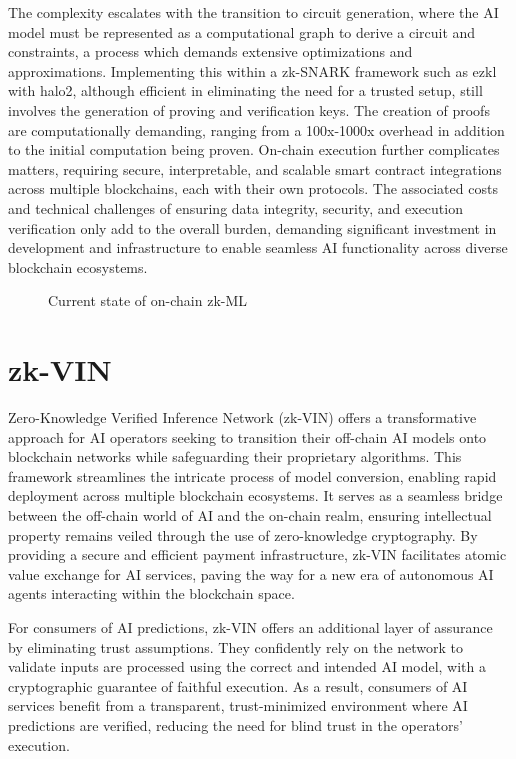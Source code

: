 \documentclass[conference]{IEEEtran}
\begin{document}
The complexity escalates with the transition to circuit generation, where the AI model must be represented as a computational graph to derive a circuit and constraints, a process which demands extensive optimizations and approximations. Implementing this within a zk-SNARK framework such as ezkl with halo2, although efficient in eliminating the need for a trusted setup, still involves the generation of proving and verification keys. The creation of proofs are computationally demanding, ranging from a 100x-1000x overhead in addition to the initial computation being proven. On-chain execution further complicates matters, requiring secure, interpretable, and scalable smart contract integrations across multiple blockchains, each with their own protocols. The associated costs and technical challenges of ensuring data integrity, security, and execution verification only add to the overall burden, demanding significant investment in development and infrastructure to enable seamless AI functionality across diverse blockchain ecosystems.

\begin{figure}[!ht]
    \centering
    
    \caption{Current state of on-chain zk-ML}
    \label{fig:Fig 4}
\end{figure}

\section{zk-VIN}
Zero-Knowledge Verified Inference Network (zk-VIN) offers a transformative approach for AI operators seeking to transition their off-chain AI models onto blockchain networks while safeguarding their proprietary algorithms. This framework streamlines the intricate process of model conversion, enabling rapid deployment across multiple blockchain ecosystems. It serves as a seamless bridge between the off-chain world of AI and the on-chain realm, ensuring intellectual property remains veiled through the use of zero-knowledge cryptography. By providing a secure and efficient payment infrastructure, zk-VIN facilitates atomic value exchange for AI services, paving the way for a new era of autonomous AI agents interacting within the blockchain space.

For consumers of AI predictions, zk-VIN offers an additional layer of assurance by eliminating trust assumptions. They confidently rely on the network to validate inputs are processed using the correct and intended AI model, with a cryptographic guarantee of faithful execution.  As a result, consumers of AI services benefit from a transparent, trust-minimized environment where AI predictions are verified, reducing the need for blind trust in the operators' execution.
\end{document}

